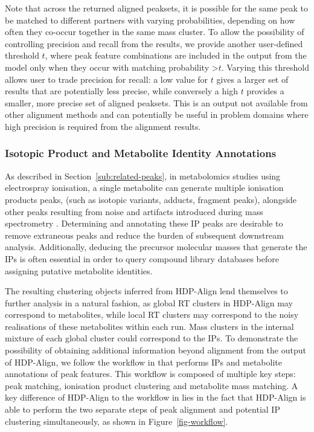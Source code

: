 Note that across the returned aligned peaksets, it is possible for the same peak to be matched to different partners with varying probabilities, depending on how often they co-occur together in the same mass cluster. To allow the possibility of controlling precision and recall from the results, we provide another user-defined threshold $t$, where peak feature combinations are included in the output from the model only when they occur with matching probability \textgreater $t$. Varying this threshold allows user to trade precision for recall: a low value for $t$ gives a larger set of results that are potentially less precise, while conversely a high $t$ provides a smaller, more precise set of aligned peaksets. This is an output not available from other alignment methods and can potentially be useful in problem domains where high precision is required from the alignment results.

\subsubsection{Isotopic Product and Metabolite Identity Annotations}
\label{subsub:isotopic-product-annotations}

As described in Section~\ref{sub:related-peaks}, in metabolomics studies using electrospray ionisation, a single metabolite can generate multiple ionisation products peaks, (such as isotopic variants, adducts, fragment peaks), alongside other peaks resulting from noise and artifacts introduced during mass spectrometry \cite{Lee2013}. Determining and annotating these IP peaks are desirable to remove extraneous peaks and reduce the burden of subsequent downstream analysis. Additionally, deducing the precursor molecular masses that generate the IPs is often essential in order to query compound library databases before assigning putative metabolite identities. 

The resulting clustering objects inferred from HDP-Align lend themselves to further analysis in a natural fashion, as global RT clusters in HDP-Align may correspond to metabolites, while local RT clusters may correspond to the noisy realisations of these metabolites within each run. Mass clusters in the internal mixture of each global cluster could correspond to the IPs. To demonstrate the possibility of obtaining additional information beyond alignment from the output of HDP-Align, we follow the workflow in \cite{Lee2013} that performs IPs and metabolite annotations of peak features. This workflow is composed of multiple key steps: peak matching, ionisation product clustering and metabolite mass matching. A key difference of HDP-Align to the workflow in \cite{Lee2013} lies in the fact that HDP-Align is able to perform the two separate steps of peak alignment and potential IP clustering simultaneously, as shown in Figure~\ref{fig-workflow}. 

